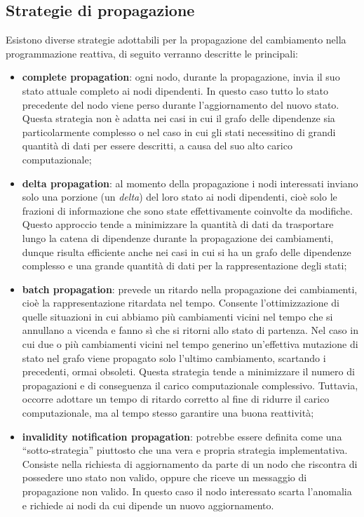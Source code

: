 \documentclass[12pt,a4paper,openright,twoside]{book}
\begin{document}
\subsection{Strategie di propagazione}
Esistono diverse strategie adottabili per la propagazione del cambiamento nella programmazione reattiva, di seguito verranno descritte le principali:
\begin{itemize}
    \item \textbf{complete propagation}: ogni nodo, durante la propagazione, invia il suo stato attuale completo ai nodi dipendenti. In questo caso tutto lo stato precedente del nodo viene perso durante l'aggiornamento del nuovo stato. Questa strategia non è adatta nei casi in cui il grafo delle dipendenze sia particolarmente complesso o nel caso in cui gli stati necessitino di grandi quantità di dati per essere descritti, a causa del suo alto carico computazionale;
    \item \textbf{delta propagation}: al momento della propagazione i nodi interessati inviano solo una porzione (un \textit{delta}) del loro stato ai nodi dipendenti, cioè solo le frazioni di informazione che sono state effettivamente coinvolte da modifiche. Questo approccio tende a minimizzare la quantità di dati da trasportare lungo la catena di dipendenze durante la propagazione dei cambiamenti, dunque risulta efficiente anche nei casi in cui si ha un grafo delle dipendenze complesso e una grande quantità di dati per la rappresentazione degli stati; 
    \item \textbf{batch propagation}: prevede un ritardo nella propagazione dei cambiamenti, cioè la rappresentazione ritardata nel tempo. Consente l'ottimizzazione di quelle situazioni in cui abbiamo più cambiamenti vicini nel tempo che si annullano a vicenda e fanno sì che si ritorni allo stato di partenza. Nel caso in cui due o più cambiamenti vicini nel tempo generino un'effettiva mutazione di stato nel grafo viene propagato solo l'ultimo cambiamento, scartando i precedenti, ormai obsoleti. Questa strategia tende a minimizzare il numero di propagazioni e di conseguenza il carico computazionale complessivo. 
    Tuttavia, occorre adottare un tempo di ritardo corretto al fine di ridurre il carico computazionale, ma al tempo stesso garantire una buona reattività; 
    \item \textbf{invalidity notification propagation}: potrebbe essere definita come una ``sotto-strategia'' piuttosto che una vera e propria strategia implementativa. Consiste nella richiesta di aggiornamento da parte di un nodo che riscontra di possedere uno stato non valido, oppure che riceve un messaggio di propagazione non valido. In questo caso il nodo interessato scarta l'anomalia e richiede ai nodi da cui dipende un nuovo aggiornamento. 
\end{itemize}
\end{document}
